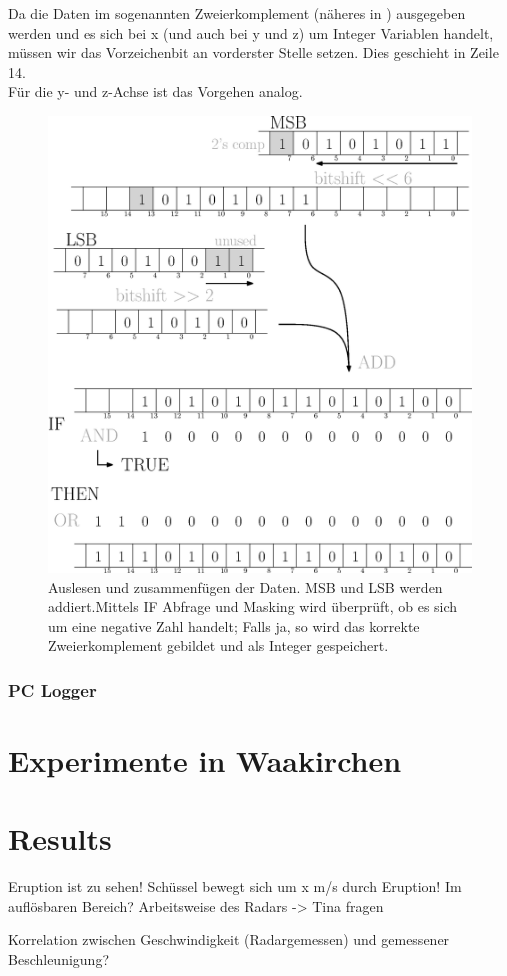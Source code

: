 \documentclass[12pt,a4paper]{scrartcl}
\begin{document}
Da die Daten im sogenannten Zweierkomplement (näheres in \citep{Tietze:2002fk}) ausgegeben werden und es sich bei x (und auch bei y und z) um Integer Variablen handelt, müssen wir das Vorzeichenbit an vorderster Stelle setzen. Dies geschieht in Zeile 14.\\

Für die y- und z-Achse ist das Vorgehen analog.

\begin{figure}[H]
\centering
\includegraphics[scale=.6]{auslesen.eps}
\caption{Auslesen und zusammenfügen der Daten. MSB und LSB werden addiert.Mittels IF Abfrage und Masking wird überprüft, ob es sich um eine negative Zahl handelt; Falls ja, so wird das korrekte Zweierkomplement gebildet und als Integer gespeichert.}
\label{auslesen}
\end{figure}

\subsubsection{PC Logger}



\section{Experimente in Waakirchen}


\section{Results}

Eruption ist zu sehen!
Schüssel bewegt sich um x m/s durch Eruption! Im auflösbaren Bereich? Arbeitsweise des Radars -> Tina fragen

Korrelation zwischen Geschwindigkeit (Radargemessen) und gemessener Beschleunigung?


\clearpage
\newpage
\appendix


\end{document}
